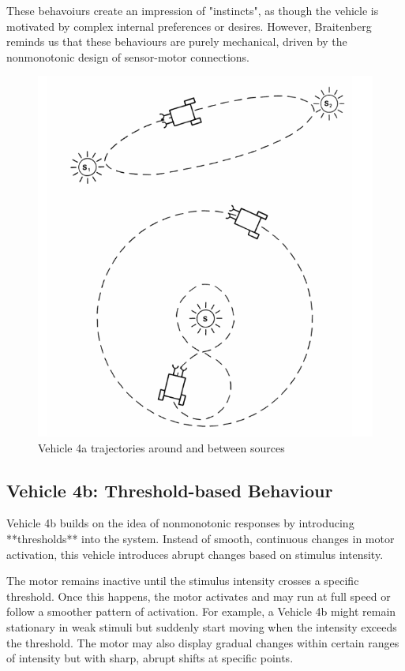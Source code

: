 \documentclass{article}
\begin{document}
	These behavoiurs create an impression of "instincts", as though the vehicle is motivated by complex internal preferences or desires. However, Braitenberg reminds us that these behaviours are purely mechanical, driven by the nonmonotonic design of sensor-motor connections.
	
	\begin{figure}[h]
		\centering
		\includegraphics[scale=0.6]{images/figure_7.png}
		\caption{Vehicle 4a trajectories around and between sources}
		\label{fig:vehicle-4a}
	\end{figure}

	\subsection*{Vehicle 4b: Threshold-based Behaviour}
	Vehicle 4b builds on the idea of nonmonotonic responses by introducing **thresholds** into the system. Instead of smooth, continuous changes in motor activation, this vehicle introduces abrupt changes based on stimulus intensity.

	The motor remains inactive until the stimulus intensity crosses a specific threshold. Once this happens, the motor activates and may run at full speed or follow a smoother pattern of activation. For example, a Vehicle 4b might remain stationary in weak stimuli but suddenly start moving when the intensity exceeds the threshold. The motor may also display gradual changes within certain ranges of intensity but with sharp, abrupt shifts at specific points.
\end{document}
